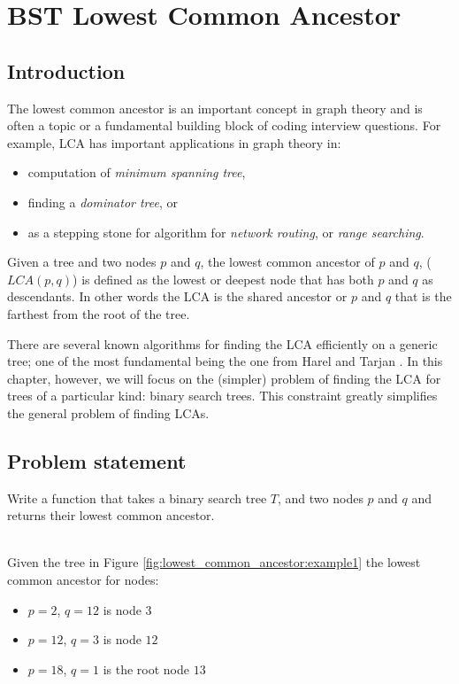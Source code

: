 %

\chapter{BST Lowest Common Ancestor}
\label{ch:lowest_common_ancestor}
\section*{Introduction}
The lowest common ancestor is an important concept in graph theory and is often a topic or
a fundamental building block of coding interview questions. For example, LCA has important applications in graph
theory in:
\begin{itemize}
	\item computation of \textit{minimum spanning tree},
	\item finding a \textit{dominator tree}, or
	\item as a stepping stone for algorithm for \textit{network routing}, or \textit{range
	searching}.
\end{itemize}
Given a tree and two nodes $p$ and $q$, the lowest common ancestor  of $p$ and $q$, ($LCA(p,q)$) is
defined as the lowest or deepest node that has both $p$ and $q$ as descendants. In other words the
LCA is the shared ancestor or $p$ and $q$ that is the farthest from the root of the tree. 

There are
several known algorithms for finding the LCA efficiently on a generic tree; one of the most
fundamental being the one from Harel and Tarjan \cite{harel84,harel80}.
In this chapter, however, we will focus on the (simpler) problem of finding the LCA for trees of a
particular kind: binary search trees. This constraint greatly simplifies the general problem of finding LCAs. 
\section{Problem statement}
\begin{exercise}
	Write a function that takes a binary search tree $T$, and two nodes $p$ and $q$ and returns
	their lowest common ancestor.

	\begin{example}
		\hfill \\
		Given the tree in Figure \ref{fig:lowest_common_ancestor:example1} the lowest common
		ancestor for nodes:
		\begin{itemize}
			\item $p = 2$, $q=12$ is node $3$
			\item $p = 12$, $q=3$ is node $12$
			\item $p = 18$, $q=1$ is the root node $13$
		\end{itemize}
		\label{ex:lower_common_ancestor:example1}
	\end{example}
\end{exercise}

